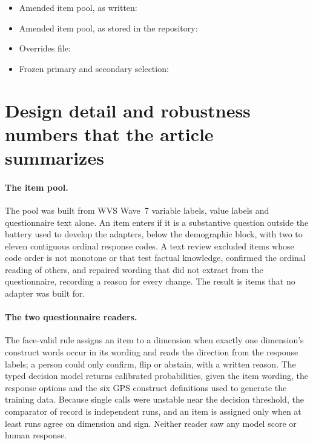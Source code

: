 \documentclass[12pt]{article}
\begin{document}
{\small
\begin{itemize}
\item Amended item pool, as written:\newline {}
\item Amended item pool, as stored in the repository:\newline {}
\item Overrides file:\newline {}
\item Frozen primary and secondary selection:\newline {}
\end{itemize}}

\section{Design detail and robustness numbers that the article summarizes}\label{sec:s-design}

\paragraph{The item pool.} The pool was built from WVS Wave~7 variable labels, value labels and questionnaire text alone. An item enters if it is a substantive question outside the battery used to develop the adapters, below the demographic block, with two to eleven contiguous ordinal response codes. A text review excluded items whose code order is not monotone or that test factual knowledge, confirmed the ordinal reading of others, and repaired wording that did not extract from the questionnaire, recording a reason for every change. The result is  items that no adapter was built for.

\paragraph{The two questionnaire readers.} The face-valid rule assigns an item to a dimension when exactly one dimension's construct words occur in its wording and reads the direction from the response labels; a person could only confirm, flip or abstain, with a written reason. The typed decision model returns calibrated probabilities, given the item wording, the response options and the six GPS construct definitions used to generate the training data. Because single calls were unstable near the decision threshold, the comparator of record is  independent runs, and an item is assigned only when at least  runs agree on dimension and sign. Neither reader saw any model score or human response.
\end{document}
